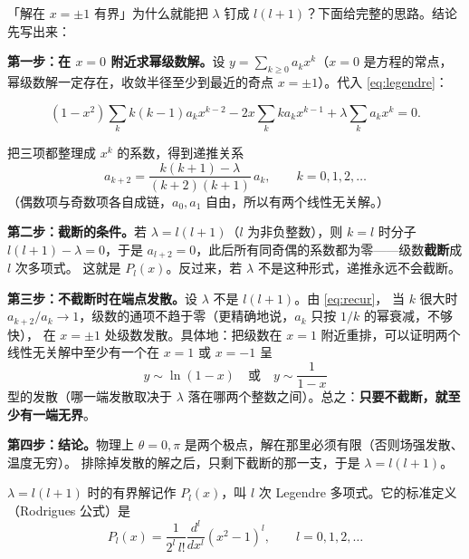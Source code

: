 「解在 $x=\pm1$ 有界」为什么就能把 $\lambda$ 钉成 $l(l+1)$？下面给完整的思路。结论先写出来：


\pfline

\textbf{第一步：在 $x=0$ 附近求幂级数解。}设 $y=\sum_{k\ge0}a_kx^k$（$x=0$ 是方程的常点，幂级数解一定存在，收敛半径至少到最近的奇点 $x=\pm1$）。代入 \eqref{eq:legendre}：

\[
(1-x^2)\sum_k k(k-1)a_kx^{k-2}-2x\sum_k ka_kx^{k-1}+\lambda\sum_ka_kx^k=0 .
\]

把三项都整理成 $x^k$ 的系数，得到递推关系
\begin{equation}
a_{k+2}=\frac{k(k+1)-\lambda}{(k+2)(k+1)}\,a_k,\qquad k=0,1,2,\dots
\label{eq:recur}
\end{equation}
（偶数项与奇数项各自成链，$a_0,a_1$ 自由，所以有两个线性无关解。）

\textbf{第二步：截断的条件。}若 $\lambda=l(l+1)$（$l$ 为非负整数），则 $k=l$ 时分子
$l(l+1)-\lambda=0$，于是 $a_{l+2}=0$，此后所有同奇偶的系数都为零——级数\textbf{截断}成 $l$ 次多项式。
这就是 $P_l(x)$。反过来，若 $\lambda$ 不是这种形式，递推永远不会截断。

\textbf{第三步：不截断时在端点发散。}设 $\lambda$ 不是 $l(l+1)$。由 \eqref{eq:recur}，
当 $k$ 很大时 $a_{k+2}/a_k\to1$，级数的通项不趋于零（更精确地说，$a_k$ 只按 $1/k$ 的幂衰减，不够快），
在 $x=\pm1$ 处级数发散。具体地：把级数在 $x=1$ 附近重排，可以证明两个线性无关解中至少有一个在 $x=1$ 或 $x=-1$ 呈
\[
y\sim \ln(1-x)\quad\text{或}\quad y\sim\frac{1}{1-x}
\]
型的发散（哪一端发散取决于 $\lambda$ 落在哪两个整数之间）。总之：\textbf{只要不截断，就至少有一端无界}。

\textbf{第四步：结论。}物理上 $\theta=0,\pi$ 是两个极点，解在那里必须有限（否则场强发散、温度无穷）。
排除掉发散的解之后，只剩下截断的那一支，于是 $\lambda=l(l+1)$。\qedsym



$\lambda=l(l+1)$ 时的有界解记作 $P_l(x)$，叫 $l$ 次 Legendre 多项式。它的标准定义（Rodrigues 公式）是
\begin{equation}
P_l(x)=\frac{1}{2^l\,l!}\frac{d^l}{dx^l}(x^2-1)^l,\qquad l=0,1,2,\dots
\label{eq:rodrigues}
\end{equation}

